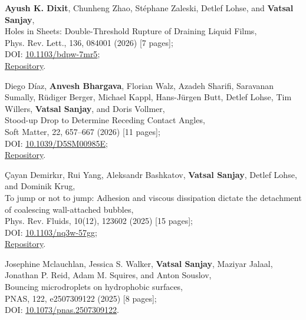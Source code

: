 \documentclass[10pt,a4paper,colorlinks,linkcolor=blue,urlcolor=blue,citecolor=blue]{moderncv}
\begin{document}
\begin{enumerate}[leftmargin=1.5em,label=\textbf{[\arabic*]}]
	\item \textbf{Ayush K. Dixit}, Chunheng Zhao, St\'ephane Zaleski, Detlef Lohse, and \textbf{Vatsal Sanjay},\\
	Holes in Sheets: Double-Threshold Rupture of Draining Liquid Films,\\
	Phys. Rev. Lett., 136, 084001 (2026) [7 pages];\\
	\faFile\hspace{0.2em}DOI: \href{https://doi.org/10.1103/bdpw-7mr5}{10.1103/bdpw-7mr5};\\
	\faGithub\hspace{0.2em}\href{https://github.com/comphy-lab/HoleySheet}{Repository}.

	\item Diego Díaz, \textbf{Anvesh Bhargava}, Florian Walz, Azadeh Sharifi, Saravanan Sumally, Rüdiger Berger, Michael Kappl, Hans-Jürgen Butt, Detlef Lohse, Tim Willers, \textbf{Vatsal Sanjay}, and Doris Vollmer,\\
	Stood-up Drop to Determine Receding Contact Angles,\\
	Soft Matter, 22, 657--667 (2026) [11 pages];\\
	\faFile\hspace{0.2em}DOI: \href{https://doi.org/10.1039/D5SM00985E}{10.1039/D5SM00985E};\\
	\faGithub\hspace{0.2em}\href{https://github.com/comphy-lab/Retracting-Droplet}{Repository}.

	\item Çayan Demirkır, Rui Yang, Aleksandr Bashkatov, \textbf{Vatsal Sanjay}, Detlef Lohse, and Dominik Krug,\\
	To jump or not to jump: Adhesion and viscous dissipation dictate the detachment of coalescing wall-attached bubbles,\\
	Phys. Rev. Fluids, 10(12), 123602 (2025) [15 pages];\\
	\faFile\hspace{0.2em}DOI: \href{https://doi.org/10.1103/nq3w-57gg}{10.1103/nq3w-57gg};\\
	\faGithub\hspace{0.2em}\href{https://github.com/VatsalSy/jumping-bubbles}{Repository}.

	\item Josephine Mclauchlan, Jessica S. Walker, \textbf{Vatsal Sanjay}, Maziyar Jalaal, Jonathan P. Reid, Adam M. Squires, and Anton Souslov,\\
	Bouncing microdroplets on hydrophobic surfaces,\\
	PNAS, 122, e2507309122 (2025) [8 pages];\\
	\faFile\hspace{0.2em}DOI: \href{https://doi.org/10.1073/pnas.2507309122}{10.1073/pnas.2507309122}.


\end{enumerate}
\end{document}
